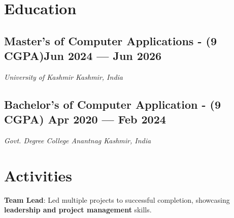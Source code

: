 \documentclass[letter,10pt]{article}
\newenvironment{zitemize}{%
\begin{itemize} \itemsep 0pt \parskip 0pt \parsep 1pt}
{\end{itemize}\vspace{-.5em}}
\begin{document}

\section{Education}
\subsection{{Master's of Computer Applications - (9 CGPA)\hfill Jun 2024 --- Jun 2026}}
\textit{University of Kashmir \hfill Kashmir, India}

\subsection{{Bachelor's of Computer Application - (9 CGPA) \hfill Apr 2020 --- Feb 2024}}
\textit{Govt. Degree College Anantnag \hfill Kashmir, India}


\section{Activities}
\textbf{Team Lead}: Led multiple projects to successful completion, showcasing \textbf{leadership and project management} skills.
\end{document}

